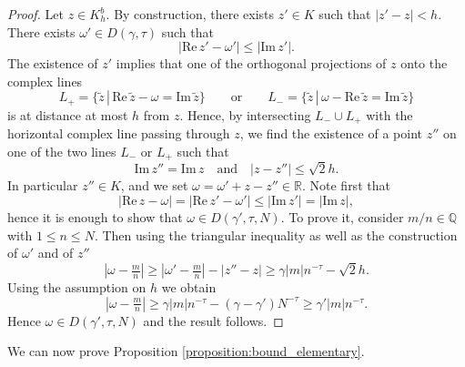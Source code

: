 \documentclass[10pt]{article}
\newcommand{\Q}{\mathbb{Q}}
\newcommand{\R}{\mathbb{R}}
\newcommand{\re}{\text{Re}\,}
\newcommand{\im}{\text{Im}\,}
\begin{document}
\begin{proof}
    Let $z\in K_h^b$. By construction, there exists $z'\in K$ such that $|z'-z|<h$.
    There exists $\omega'\in D(\gamma,\tau)$ such that 
    \[
    |\re z'-\omega'|\leq |\im z'|.
    \]
    The existence of $z'$ implies that one of the orthogonal projections of $z$ onto the complex lines 
    \[
    L_+=\{\tilde z\,|\, \re\tilde z-\omega = \im\tilde z\}
    \qquad\text{or}\qquad
    L_-=\{\tilde z\,|\, \omega-\re\tilde z = \im\tilde z\}
    \]
    is at distance at most $h$ from $z$. Hence, by intersecting $L_-\cup L_+$ with the horizontal complex line passing through $z$, we find the existence of a point $z''$ on one of the two lines $L_-$ or $L_+$ such that 
    \[
    \im z'' = \im z
    \quad\text{and}\quad 
    |z-z''| \leq \sqrt 2 h.
    \]
    In particular $z''\in K$, and we set $\omega = \omega'+z-z''\in\R$.
    Note first that
    \[
    |\re z-\omega| = |\re z'-\omega'|\leq|\im z'|=|\im z|,
    \]
    hence it is enough to show that $\omega\in D(\gamma',\tau,N)$. To prove it, consider $m/n\in\Q$ with $1\leq n\leq N$. Then using the triangular inequality as well as the construction of $\omega'$ and of $z''$
    \[
    \left|\omega-\tfrac{m}{n}\right|
    \geq
    \left|\omega'-\tfrac{m}{n}\right|-|z''-z|
    \geq 
    \gamma|m|n^{-\tau}-\sqrt 2h.
    \]
    Using the assumption on $h$ we obtain
    \[
    \left|\omega-\tfrac{m}{n}\right|
    \geq 
    \gamma|m|n^{-\tau}-(\gamma-\gamma')N^{-\tau}\geq \gamma'|m|n^{-\tau}.
    \]
    Hence $\omega\in D(\gamma',\tau,N)$ and the result follows.
\end{proof}

We can now prove Proposition \ref{proposition:bound_elementary}.
\end{document}
